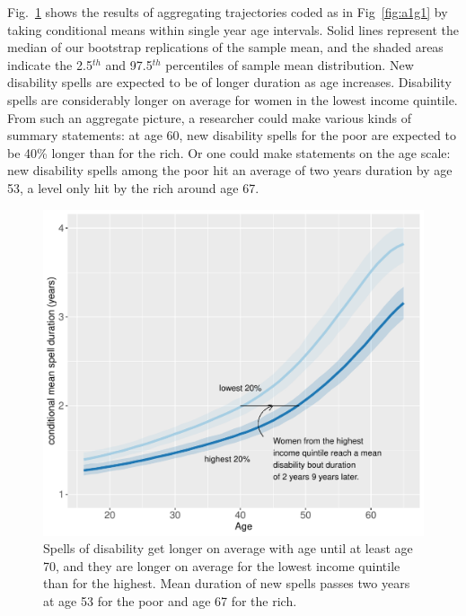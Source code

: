 \documentclass[a4paper,left=1.25cm,right=1.25cm,top=1.25cm,bottom=1.25cm]{article}
\begin{document}
Fig.~\ref{fig:a1m1} shows the results of aggregating trajectories coded as in Fig~\ref{fig:a1g1} by taking conditional means within single year age intervals. Solid lines represent the median of our bootstrap replications of the sample mean, and the shaded areas indicate the 2.5$^{th}$ and 97.5$^{th}$ percentiles of sample mean distribution. New disability spells are expected to be of longer duration as age increases. Disability spells are considerably longer on average for women in the lowest income quintile. From such an aggregate picture, a researcher could make various kinds of summary statements: at age 60, new disability spells for the poor are expected to be 40\% longer than for the rich. Or one could make statements on the age scale: new disability spells among the poor hit an average of two years duration by age 53, a level only hit by the rich around age 67.
\begin{figure}[ht!]
    \centering
    \includegraphics[scale=.6]{Figures/App1_macro1.pdf}
    \caption{Spells of disability get longer on average with age until at least age 70, and they are longer on average for the lowest income quintile than for the highest. Mean duration of new spells passes two years at age 53 for the poor and age 67 for the rich.}
    \label{fig:a1m1}
\end{figure}
\end{document}
